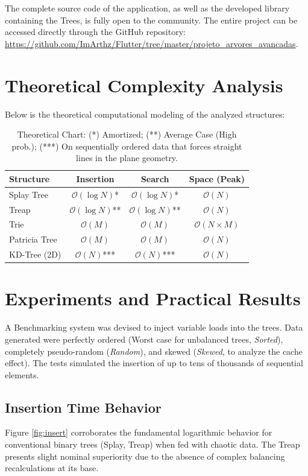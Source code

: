 \documentclass[12pt,a4paper]{article}
\begin{document}
The complete source code of the application, as well as the developed library containing the Trees, is fully open to the community. The entire project can be accessed directly through the GitHub repository: \\ \url{https://github.com/ImArthz/Flutter/tree/master/projeto_arvores_avancadas}.

\section{Theoretical Complexity Analysis}
Below is the theoretical computational modeling of the analyzed structures:

\begin{table}[H]
\centering
\begin{tabular}{@{}lccc@{}}
\toprule
\textbf{Structure} & \textbf{Insertion} & \textbf{Search} & \textbf{Space (Peak)} \\ \midrule
Splay Tree & $\mathcal{O}(\log N)$* & $\mathcal{O}(\log N)$* & $\mathcal{O}(N)$ \\
Treap & $\mathcal{O}(\log N)$** & $\mathcal{O}(\log N)$** & $\mathcal{O}(N)$ \\
Trie & $\mathcal{O}(M)$ & $\mathcal{O}(M)$ & $\mathcal{O}(N \times M)$ \\
Patricia Tree & $\mathcal{O}(M)$ & $\mathcal{O}(M)$ & $\mathcal{O}(N)$ \\
KD-Tree (2D) & $\mathcal{O}(N)$*** & $\mathcal{O}(N)$*** & $\mathcal{O}(N)$ \\ \bottomrule
\end{tabular}
\caption{Theoretical Chart: (*) Amortized; (**) Average Case (High prob.); (***) On sequentially ordered data that forces straight lines in the plane geometry.}
\end{table}

\section{Experiments and Practical Results}
A Benchmarking system was devised to inject variable loads into the trees. Data generated were perfectly ordered (Worst case for unbalanced trees, \textit{Sorted}), completely pseudo-random (\textit{Random}), and skewed (\textit{Skewed}, to analyze the cache effect). The tests simulated the insertion of up to tens of thousands of sequential elements. 

\subsection{Insertion Time Behavior}
Figure \ref{fig:insert} corroborates the fundamental logarithmic behavior for conventional binary trees (Splay, Treap) when fed with chaotic data. The Treap presents slight nominal superiority due to the absence of complex balancing recalculations at its base.
\end{document}
